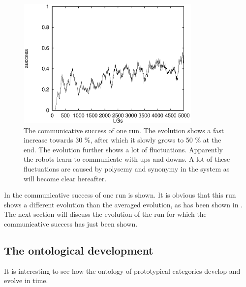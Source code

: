 \begin{figure}[t]
\centerline{\includegraphics[width=9cm]{basic/cs0.eps}}
\caption{The communicative success of one run. The evolution shows a fast increase towards 30 \%, after which it slowly grows to 50 \% at the end. The evolution further shows a lot of fluctuations. Apparently the robots learn to communicate with ups and downs. A lot of these fluctuations are caused by polysemy and synonymy in the system as will become clear hereafter.}
\label{f:st:cs0}
\end{figure}

In  the communicative success of one run is shown. It is obvious that this run shows a different evolution than the averaged evolution, as has been shown in . The next section will discuss the evolution of the run for which the communicative success has just been shown.

\subsection{The ontological development}\label{s:cat:evol}
It is interesting to see how the ontology of prototypical categories develop and evolve in time.

